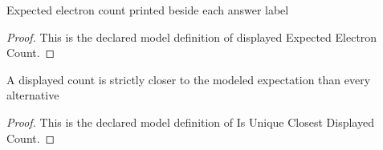 \begin{definition}
  \label{def:physics:phyx-mini-0645:phyxminiproblems-problemphyxmini0645-displayedexpectedelectroncount}
  Expected electron count printed beside each answer label
\end{definition}
\begin{proof}
  This is the declared model definition of displayed Expected Electron Count.
\end{proof}
\begin{definition}
  \label{def:physics:phyx-mini-0645:phyxminiproblems-problemphyxmini0645-isuniqueclosestdisplayedcount}
  A displayed count is strictly closer to the modeled expectation than every alternative
\end{definition}
\begin{proof}
  This is the declared model definition of Is Unique Closest Displayed Count.
\end{proof}
